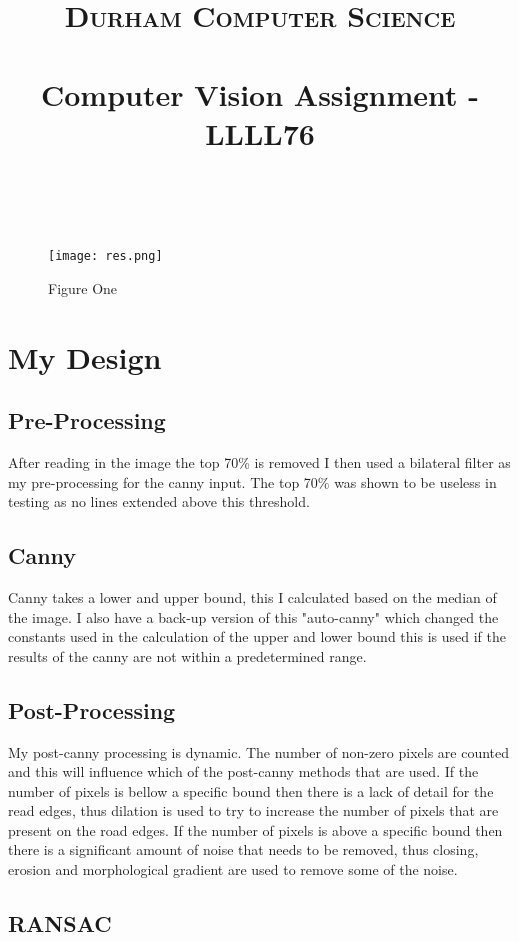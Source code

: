 \documentclass[paper=a4, fontsize=11pt]{scrartcl}
\date{}
\title{
		\vspace{-0.5in} 	
		\usefont{OT1}{bch}{b}{n}
		\normalfont \normalsize \textsc{Durham Computer Science} \\ [5pt]
		\horrule{0.5pt} \\[0.4cm]
		\huge Computer Vision Assignment - LLLL76\\
		\horrule{2pt} \\[0.5cm]
		\vspace{-1in} 	
}
\numberwithin{equation}{section}		%
\numberwithin{figure}{section}			%
\numberwithin{table}{section}				%
\begin{document}
\maketitle
\begin{wrapfigure}{r}{0.33\textwidth} %
    \centering
    \caption{Figure One}
    \texttt{[image: res.png]}
\end{wrapfigure}
\section{My Design}
\subsection{Pre-Processing}

After reading in the image the top 70\% is removed I then used a bilateral filter as my pre-processing for the canny input. The top 70\% was shown to be useless in testing as no lines extended above this threshold.

\subsection{Canny}

Canny takes a lower and upper bound, this I calculated based on the median of the image. I also have a back-up version of this "auto-canny" which changed the constants used in the calculation of the upper and lower bound this is used if the results of the canny are not within a predetermined range.

\subsection{Post-Processing}

My post-canny processing is dynamic. The number of non-zero pixels are counted and this will influence which of the post-canny methods that are used. If the number of pixels is bellow a specific bound then there is a lack of detail for the read edges, thus dilation is used to try to increase the number of pixels that are present on the road edges. If the number of pixels is above a specific bound then there is a significant amount of noise that needs to be removed, thus closing, erosion and morphological gradient are used to remove some of the noise.

\subsection{RANSAC}
\end{document}
